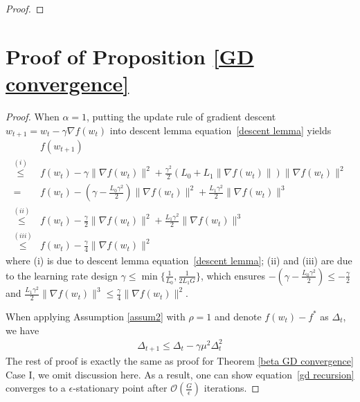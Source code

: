 \documentclass[10pt]{article} %
\def\eqref#1{equation~\ref{#1}}
\newtheorem{proof}{Proof}
\begin{document}
\begin{proof}
\end{proof}
\section{Proof of Proposition \ref{GD convergence}}\label{Appendix F}
\gdconvergence*
\begin{proof}\label{Proof of GD convergence}
    When $\alpha=1$, putting the update rule of gradient descent
    $w_{t+1}=w_t - \gamma \nabla f(w_t)$ into descent lemma \eqref{descent lemma} yields
    \begin{align}
        &f(w_{t+1})\nonumber\\
        \overset{(i)}{\leq}& f(w_t)-\gamma \big \|\nabla f(w_t) \big \|^2+\frac{\gamma^2}{2}(L_0+L_1\big\| \nabla f(w_t)\big\|)
        \big \|\nabla f(w_t) \big \|^2\nonumber \\
        =&f(w_t)-(\gamma-\frac{L_0\gamma^2}{2})\big\|\nabla f(w_t) \big\|^2+\frac{L_1\gamma^2}{2}\big \|\nabla f(w_t) \big \|^3\nonumber\\
        \overset{(ii)}{\leq}& f(w_t)-\frac{\gamma}{2}\big\|\nabla f(w_t) \big\|^2+\frac{L_1\gamma^2}{2}\big\| \nabla f(w_t)\big\|^3\nonumber\\
        \overset{(iii)}{\leq}& f(w_t) - \frac{\gamma}{4}\big\|\nabla f(w_t) \big\|^2
    \end{align}
    where (i) is due to descent lemma \eqref{descent lemma}; (ii) and (iii) are due to the learning rate design $\gamma \leq \min \{\frac{1}{L_0},\frac{1}{2L_1G}  \}$, which ensures $-(\gamma-\frac{L_0\gamma^2}{2})\leq -\frac{\gamma}{2}$ and $\frac{L_1\gamma^2}{2}\| \nabla f(w_t)\|^3\leq \frac{\gamma}{4}\|\nabla f(w_t) \|^2$.
    
    When applying Assumption \ref{assum2} with $\rho=1$ and denote $f(w_t)-f^*$ as $\Delta_t$, we have
    \begin{align}
        \Delta_{t+1}\leq \Delta_t -\gamma\mu^2\Delta_t^2
        \label{gd recursion}
    \end{align}
    The rest of proof is exactly the same as proof for Theorem \ref{beta GD convergence} Case I, we omit discussion here. As a result, one can show \eqref{gd recursion} converges to a $\epsilon$-stationary point after $\mathcal{O}(\frac{G}{\epsilon})$ iterations.
\end{proof}
\end{document}
